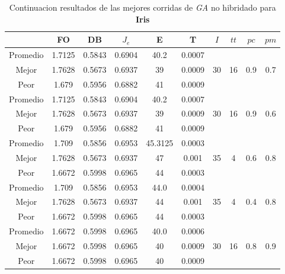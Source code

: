 \begin{table}[h!]
    \footnotesize
    \begin{center}
        \begin{tabular}{|c|c|c|c|c|c|c|c|c|c|}
        \hline
            & {\bf FO} & {\bf DB} & $J_e$ & {\bf E} & {\bf T} & $I$ & $tt$ & $pc$ & $pm$ \\
        \hline
        \hline
            Promedio  & 1.7125 & 0.5843 & 0.6904 & 40.2 & 0.0007 &  &  &  & \\
            \cline{1-6}
            Mejor & 1.7628 & 0.5673  & 0.6937 & 39 & 0.0009 & 30 & 16 & 0.9 & 0.7\\
            \cline{1-6}
            Peor & 1.679 & 0.5956  & 0.6882 & 41 & 0.0009 &  &  &  & \\
        \hline
        \hline
            Promedio  & 1.7125 & 0.5843 & 0.6904 & 40.2 & 0.0007 &  &  &  & \\
            \cline{1-6}
            Mejor & 1.7628 & 0.5673  & 0.6937 & 39 & 0.0009 & 30 & 16 & 0.9 & 0.6\\
            \cline{1-6}
            Peor & 1.679 & 0.5956  & 0.6882 & 41 & 0.0009 &  &  &  & \\
        \hline
        \hline
            Promedio  & 1.709 & 0.5856 & 0.6953 & 45.3125 & 0.0003 &  &  &  & \\
            \cline{1-6}
            Mejor & 1.7628 & 0.5673  & 0.6937 & 47 & 0.001 & 35 & 4 & 0.6 & 0.8\\
            \cline{1-6}
            Peor & 1.6672 & 0.5998  & 0.6965 & 44 & 0.0003 &  &  &  & \\
        \hline
        \hline
            Promedio  & 1.709 & 0.5856 & 0.6953 & 44.0 & 0.0004 &  &  &  & \\
            \cline{1-6}
            Mejor & 1.7628 & 0.5673  & 0.6937 & 44 & 0.001 & 35 & 4 & 0.4 & 0.8\\
            \cline{1-6}
            Peor & 1.6672 & 0.5998  & 0.6965 & 44 & 0.0003 &  &  &  & \\
        \hline
        \hline
            Promedio  & 1.6672 & 0.5998 & 0.6965 & 40.0 & 0.0006 &  &  &  & \\
            \cline{1-6}
            Mejor & 1.6672 & 0.5998  & 0.6965 & 40 & 0.0009 & 30 & 16 & 0.8 & 0.9\\
            \cline{1-6}
            Peor & 1.6672 & 0.5998  & 0.6965 & 40 & 0.0009 &  &  &  & \\
        \hline
        \end{tabular}
        \caption{Continuacion resultados de las mejores corridas de \emph{GA} no hibridado para {\bf Iris}}
        \label{tb:tablegaalgcsvc}
    \end{center}
\end{table}
